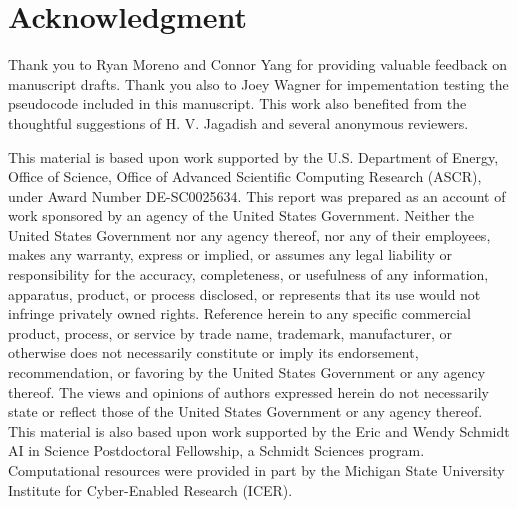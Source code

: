 \section*{Acknowledgment}

Thank you to Ryan Moreno and Connor Yang for providing valuable feedback on manuscript drafts.
Thank you also to Joey Wagner for impementation testing the pseudocode included in this manuscript.
This work also benefited from the thoughtful suggestions of H. V. Jagadish and several anonymous reviewers.

This material is based upon work supported by the U.S. Department of Energy, Office of Science, Office of Advanced Scientific Computing Research (ASCR), under Award Number DE-SC0025634.
This report was prepared as an account of work sponsored by an agency of the United States Government.
Neither the United States Government nor any agency thereof, nor any of their employees, makes any warranty, express or implied, or assumes any legal liability or responsibility for the accuracy, completeness, or usefulness of any information, apparatus, product, or process disclosed, or represents that its use would not infringe privately owned rights.
Reference herein to any specific commercial product, process, or service by trade name, trademark, manufacturer, or otherwise does not necessarily constitute or imply its endorsement, recommendation, or favoring by the United States Government or any agency thereof.
The views and opinions of authors expressed herein do not necessarily state or reflect those of the United States Government or any agency thereof.
This material is also based upon work supported by the Eric and Wendy Schmidt AI in Science Postdoctoral Fellowship, a Schmidt Sciences program.
Computational resources were provided in part by the Michigan State University Institute for Cyber-Enabled Research (ICER).
